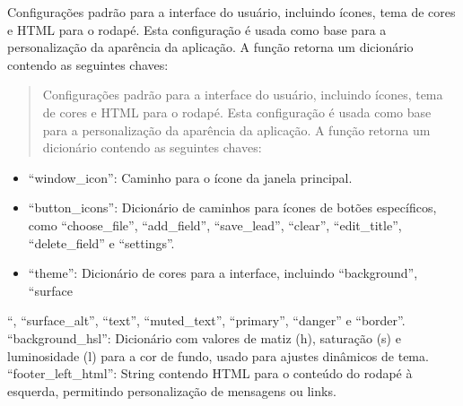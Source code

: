 \documentclass[letterpaper,10pt,english]{sphinxmanual}
\begin{document}
\begin{fulllineitems}
\label{\detokenize{api/config:config.default_ui_config}}
\pysigstartsignatures
\pysiglinewithargsret
{}
{}
{}
\pysigstopsignatures
\sphinxAtStartPar
Configurações padrão para a interface do usuário, incluindo ícones, tema de cores e HTML para o rodapé. Esta configuração é usada como base para a personalização da aparência da aplicação. A função retorna um dicionário contendo as seguintes chaves:
\begin{quote}\begin{description}
\sphinxAtStartPar
Configurações padrão para a interface do usuário, incluindo ícones, tema de cores e HTML para o rodapé. Esta configuração é usada como base para a personalização da aparência da aplicação. A função retorna um dicionário contendo as seguintes chaves:

\sphinxAtStartPar
{}

\end{description}\end{quote}
\begin{itemize}
\item {} 
\sphinxAtStartPar
“window\_icon”: Caminho para o ícone da janela principal.

\item {} 
\sphinxAtStartPar
“button\_icons”: Dicionário de caminhos para ícones de botões específicos, como “choose\_file”, “add\_field”, “save\_lead”, “clear”, “edit\_title”, “delete\_field” e “settings”.

\item {} 
\sphinxAtStartPar
“theme”: Dicionário de cores para a interface, incluindo “background”, “surface

\end{itemize}

\sphinxAtStartPar
“, “surface\_alt”, “text”, “muted\_text”, “primary”, “danger” e “border”.
\sphinxhyphen{} “background\_hsl”: Dicionário com valores de matiz (h), saturação (s) e luminosidade (l) para a cor de fundo, usado para ajustes dinâmicos de tema.
\sphinxhyphen{} “footer\_left\_html”: String contendo HTML para o conteúdo do rodapé à esquerda, permitindo personalização de mensagens ou links.

\end{fulllineitems}
\end{document}
